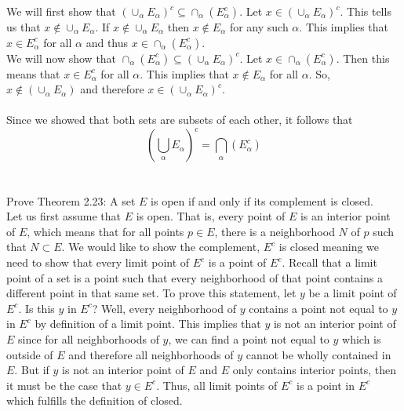 \documentclass[12pt]{article}
\begin{document}
We will first show that $\left( \cup_{\alpha}E_{\alpha} \right)^{c} \subseteq \cap_{\alpha}\left(E^{c}_{\alpha} \right)$. Let $x \in \left( \cup_{\alpha}E_{\alpha} \right)^{c}$. This tells us that $x \notin \cup_{\alpha}E_{\alpha}$. If $x \notin \cup_{\alpha}E_{\alpha}$ then $x \notin E_{\alpha}$ for any such $\alpha$. This implies that $x \in E_{\alpha}^{c}$ for all $\alpha$ and thus $x \in \cap_{\alpha}\left(E^{c}_{\alpha} \right)$. \\

We will now show that $\cap_{\alpha}\left(E^{c}_{\alpha} \right) \subseteq \left( \cup_{\alpha}E_{\alpha} \right)^{c}$. Let $x \in \cap_{\alpha}\left(E^{c}_{\alpha} \right)$. Then this means that $x \in E^{c}_{\alpha}$ for all $\alpha$. This implies that $x \notin E_{\alpha}$ for all $\alpha$. So, $x \notin \left( \cup_{\alpha}E_{\alpha} \right)$ and therefore $x \in \left( \cup_{\alpha}E_{\alpha} \right)^{c}$. \\ \\

Since we showed that both sets are subsets of each other, it follows that \begin{equation}
\left( \bigcup_{\alpha}E_{\alpha} \right)^{c} = \bigcap_{\alpha}\left(E^{c}_{\alpha} \right)
\end{equation} \\ \\


\problem  Prove Theorem 2.23: A set $E$ is open if and only if its complement is closed.  \\ 

Let us first assume that $E$ is open. That is, every point of $E$ is an interior point of $E$, which means that for all points $p \in E$, there is a neighborhood $N$ of $p$ such that $N \subset E$. We would like to show the complement, $E^{c}$ is closed meaning we need to show that every limit point of $E^{c}$ is a point of $E^{c}$. Recall that a limit point of a set is a point such that every neighborhood of that point contains a different point in that same set. To prove this statement, let $y$ be a limit point of $E^{c}$. Is this $y$ in $E^{c}$? Well,  every neighborhood of $y$ contains a point not equal to $y$ in $E^{c}$ by definition of a limit point. This implies that $y$ is not an interior point of $E$ since for all neighborhoods of $y$, we can find a point not equal to $y$ which is outside of $E$ and therefore all neighborhoods of $y$ cannot be wholly contained in $E$. But if $y$ is not an interior point of $E$ and $E$ only contains interior points, then it must be the case that $y \in E^{c}$. Thus, all limit points of $E^{c}$ is a point in $E^{c}$ which fulfills the definition of closed. \\ \\
\end{document}
